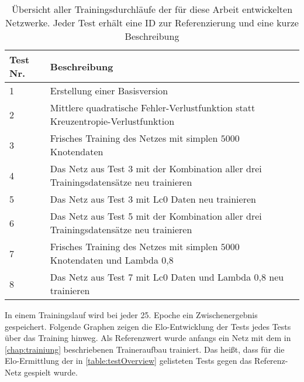 \begin{table}[ht]
  \caption{Übersicht aller Trainingsdurchläufe der für diese Arbeit entwickelten Netzwerke. Jeder Test erhält eine ID zur Referenzierung und eine kurze Beschreibung}
  \label{table:testOverview}
  \renewcommand{\arraystretch}{1.2}
  \centering
  \sffamily
  \begin{footnotesize}
    \begin{tabular}{l l}
      \toprule
      \textbf{Test Nr.} & \textbf{Beschreibung}                                                                 \\
      \midrule
      1                 & Erstellung einer Basisversion                                                        \\
      2                 & Mittlere quadratische Fehler-Verlustfunktion statt Kreuzentropie-Verlustfunktion      \\
      3                 & Frisches Training des Netzes mit simplen $5000$ Knotendaten                          \\
      4                 & Das Netz aus Test 3 mit der Kombination aller drei Trainingsdatensätze neu trainieren \\
      5                 & Das Netz aus Test 3 mit \ac{Lc0} Daten neu trainieren                                 \\
      6                 & Das Netz aus Test 5 mit der Kombination aller drei Trainingsdatensätze neu trainieren \\
      7                 & Frisches Training des Netzes mit simplen $5000$ Knotendaten und Lambda 0,8           \\
      8                 & Das Netz aus Test 7 mit \ac{Lc0} Daten und Lambda 0,8 neu trainieren                  \\
      \bottomrule
    \end{tabular}
  \end{footnotesize}
  \rmfamily
\end{table}


In einem Trainingslauf wird bei jeder 25. Epoche ein Zwischenergebnis gespeichert. Folgende Graphen zeigen die Elo-Entwicklung der Tests jedes Tests über das Training hinweg. Als Referenzwert wurde anfangs ein Netz mit dem in \autoref{chap:trainiung} beschriebenen Traineraufbau trainiert. Das heißt, dass für die Elo-Ermittlung der in \autoref{table:testOverview} gelisteten Tests gegen das Referenz-Netz gespielt wurde.

